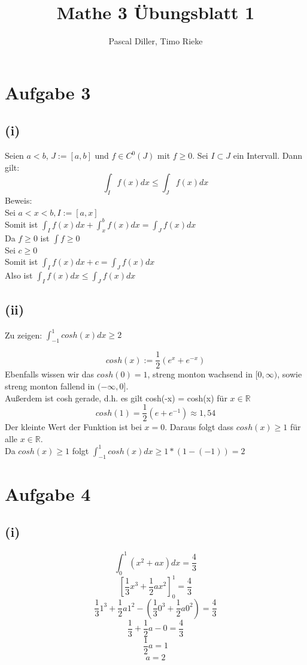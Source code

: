 \documentclass{article}
\title{Mathe 3 Übungsblatt 1}
\author{Pascal Diller, Timo Rieke}
\date{}
\begin{document}
\maketitle
\section*{Aufgabe 3}
\subsection*{(i)}
Seien $a<b$, $J:=[a,b]$ und $f \in C^0(J)$ mit $f \geq 0$. Sei $I \subset J$ ein Intervall. Dann gilt:
\[\int_I f(x) dx \leq \int_J f(x)dx\]
Beweis: \\
Sei $a<x<b, I:= [a,x]$ \\
Somit ist \(\int_If(x)dx + \int_x^b f(x)dx = \int_J f(x)dx \) \\
Da \(f\geq 0 \) ist \( \int f \geq 0\) \\
Sei $c \geq 0$ \\
Somit ist \(\int_I{f(x) dx} + c = \int_Jf(x)dx\) \\
Also ist \(\int_I f(x) dx \leq \int_J f(x)dx\)

\subsection*{(ii)}
Zu zeigen: \(\int_{-1}^{1} cosh(x) dx \geq 2\)

\[cosh(x):= \frac{1}{2}(e^x+e^{-x})\]
Ebenfalls wissen wir das $cosh(0)=1$, streng monton wachsend in $[0,\infty)$, sowie streng monton fallend in $(-\infty,0]$. \\
Außerdem ist cosh gerade, d.h. es gilt cosh(-x) = cosh(x) für $x\in \mathbb{R}$
\[cosh(1) = \frac{1}{2}(e+e^{-1}) \approx 1,54\]
Der kleinte Wert der Funktion ist bei $x=0$. Daraus folgt dass $cosh(x)\geq1$ für alle $x \in \mathbb{R}$. \\
Da $cosh(x) \geq 1$ folgt $\int_{-1}^1 cosh(x) dx \geq 1*(1-(-1)) =2$

\section*{Aufgabe 4}
\subsection*{(i)}
\[\int_0^1{(x^2+ax) dx} = \frac{4}{3}\]
\[[\frac{1}{3}x^3+\frac{1}{2}ax^2]_0^1 = \frac{4}{3}\]
\[\frac{1}{3}1^3+\frac{1}{2}a1^2 - (\frac{1}{3}0^3+\frac{1}{2}a0^2) = \frac{4}{3}\]
\[\frac{1}{3}+\frac{1}{2}a - 0 = \frac{4}{3}\]
\[\frac{1}{2}a  = 1 \] 
\[a=2\]
\end{document}
